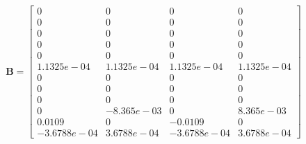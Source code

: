 \begin{equation*}
\mathbf{B} = \begin{bmatrix} 0 & 0 & 0 & 0 \\
0 & 0 & 0 & 0 \\
0 & 0 & 0 & 0 \\
0 & 0 & 0 & 0 \\
0 & 0 & 0 & 0 \\
1.1325e-04 & 1.1325e-04 & 1.1325e-04 & 1.1325e-04 \\
0 & 0 & 0 & 0 \\
0 & 0 & 0 & 0 \\
0 & 0 & 0 & 0 \\
0 & -8.365e-03 & 0 & 8.365e-03 \\
0.0109 & 0 & -0.0109 & 0 \\
-3.6788e-04 & 3.6788e-04 & -3.6788e-04 & 3.6788e-04 \end{bmatrix}
\end{equation*}



